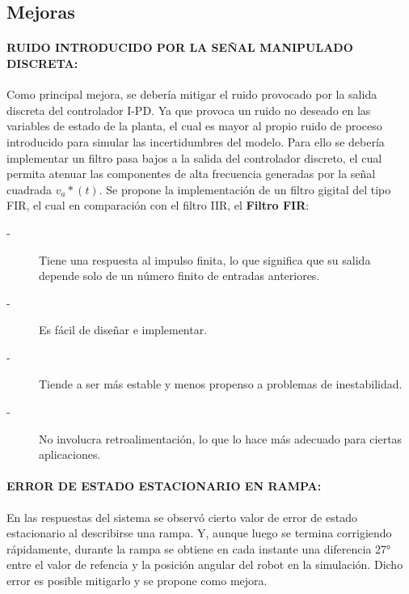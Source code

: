 \documentclass{article}
\begin{document}
\begin{sloppypar}
\subsection{Mejoras}
\label{sec:Mejoras}

\paragraph{RUIDO INTRODUCIDO POR LA SEÑAL MANIPULADO DISCRETA:}
\label{sec:RUIDO INTRODUCIDO POR LA SEÑAL MANIPULADO DISCRETA:}
\hfill

Como principal mejora, se debería mitigar el ruido provocado por la salida discreta del controlador I-PD. Ya que provoca un ruido no deseado en las variables de estado de la planta, el cual es mayor al propio ruido de proceso introducido para simular las incertidumbres del modelo. Para ello se debería implementar un filtro pasa bajos a la salida del controlador discreto, el cual permita atenuar las componentes de alta frecuencia generadas por la señal cuadrada $v_a*(t)$. Se propone la implementación de un filtro gigital del tipo FIR, el cual en comparación con el filtro IIR, el \textbf{Filtro FIR}:

\begin{description}
    \item[-] Tiene una respuesta al impulso finita, lo que significa que su salida depende solo de un número finito de entradas anteriores.
    \item[-] Es fácil de diseñar e implementar.
    \item[-] Tiende a ser más estable y menos propenso a problemas de inestabilidad.
    \item[-] No involucra retroalimentación, lo que lo hace más adecuado para ciertas aplicaciones.
\end{description}



\paragraph{ERROR DE ESTADO ESTACIONARIO EN RAMPA:}
\label{sec:ERROR DE ESTADO ESTACIONARIO EN RAMPA:}
\hfill

En las respuestas del sistema se observó cierto valor de error de estado estacionario al describirse una rampa. Y, aunque luego se termina corrigiendo rápidamente, durante la rampa se obtiene en cada instante una diferencia 27° entre el valor de refencia y la posición angular del robot en la simulación. Dicho error es posible mitigarlo y se propone como mejora.


\end{sloppypar}
\end{document}
